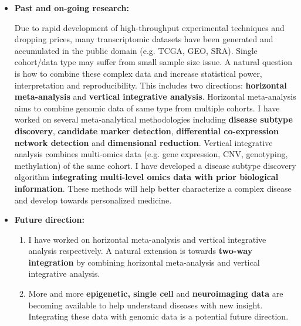 \documentclass[a4paper, 10pt]{article}
\begin{document}
\begin{itemize}
\item \textbf{Past and on-going research:}

Due to rapid development of high-throughput experimental techniques and dropping prices, many transcriptomic datasets have
been generated and accumulated in the public domain (e.g. TCGA, GEO, SRA).
Single cohort/data type may suffer from small sample size issue.
A natural question is how to combine these complex data and increase statistical power, interpretation and reproducibility.
This includes two directions: \textbf{horizontal meta-analysis} and \textbf{vertical integrative analysis}. 
Horizontal meta-analysis aims to combine genomic data of same type from multiple cohorts.
I have worked on several meta-analytical methodologies including 
\textbf{disease subtype discovery}\cite{ref:MSKM}, 
\textbf{candidate marker detection}\cite{ref:BayesMP},
\textbf{differential co-expression network detection}\cite{ref:metaDCN}
and \textbf{dimensional reduction}\cite{ref:metaPCA}.
Vertical integrative analysis combines multi-omics data 
(e.g. gene expression, CNV, genotyping, methylation) of the same cohort.
I have developed a disease subtype discovery algorithm \textbf{integrating multi-level omics data with prior biological information}\cite{ref:ISKmeans}.
These methods will help better characterize a complex disease and develop towards personalized medicine.

\item \textbf{Future direction:}
\begin{enumerate}
\item I have worked on horizontal meta-analysis and vertical integrative analysis respectively. 
A natural extension is towards \textbf{two-way integration} by combining horizontal meta-analysis and vertical integrative analysis. 
\item 
More and more \textbf{epigenetic, single cell} and \textbf{neuroimaging data} are becoming available to help understand diseases with new insight.
Integrating these data with genomic data is a potential future direction.
\end{enumerate}

\end{itemize}
\end{document}
